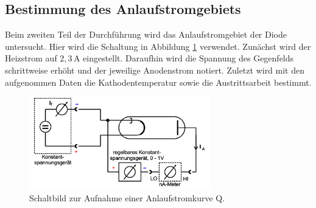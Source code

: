 \subsection{Bestimmung des Anlaufstromgebiets}
Beim zweiten Teil der Durchführung wird das Anlaufstromgebiet der Diode untersucht. Hier wird die 
Schaltung in Abbildung \ref{fig:zweiteApparatur} verwendet. Zunächst wird der Heizstrom auf $2,3\,\unit{\ampere}$
eingestellt. Daraufhin wird die Spannung des Gegenfelds schrittweise erhöht und der jeweilige Anodenstrom notiert. 
Zuletzt wird mit den aufgenommen Daten die Kathodentemperatur sowie die Austrittsarbeit bestimmt.
\begin{figure}[H]
    \centering
    \includegraphics[width=0.7\textwidth]{content/Bilder/zweiterAufbau.png}
    \caption{Schaltbild zur Aufnahme einer Anlaufstromkurve Q\cite{anleitungV504}.}
    \label{fig:zweiteApparatur}
\end{figure}
